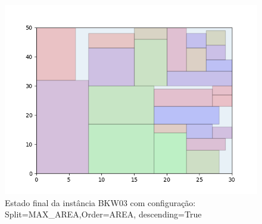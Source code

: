 \begin{figure}[H]
    \centering
    \caption[]{Estado final da instância BKW03 com configuração: Split=MAX_AREA,Order=AREA, descending=True}
    \label{fig:bkw03-max_area-area-true}
    \includegraphics[scale=0.5]{output/figures/bkw/bkw03/max_area/area/true/00}
\end{figure}